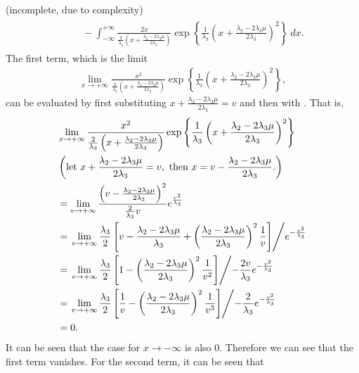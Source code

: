 \begin{answer}{(incomplete, due to complexity)}
\begin{align}
\begin{split}
			&\phantom{=} - \int_{-\infty}^{+\infty} \frac{2x}{\frac{2}{\lambda_3} \left( x + \frac{\lambda_2 - 2\lambda_3\mu}{2\lambda_3} \right)}\exp\left\{ \frac{1}{\lambda_3} \left( x + \frac{\lambda_2 - 2\lambda_3\mu}{2\lambda_3} \right)^2  \right\}\ dx.
		\end{split}
	\end{align}
	The first term, which is the limit
	\begin{align}
		\lim_{x \rightarrow +\infty} \frac{x^2}{\frac{2}{\lambda_3} \left( x + \frac{\lambda_2 - 2\lambda_3\mu}{2\lambda_3} \right)}\exp\left\{ \frac{1}{\lambda_3} \left( x + \frac{\lambda_2 - 2\lambda_3\mu}{2\lambda_3} \right)^2  \right\},
	\end{align}
	can be evaluated by first substituting $x + \frac{\lambda_2 - 2\lambda_3\mu}{2\lambda_3} = v$ and then with \lhopitalsrule. That is,
	\begin{align}
		&\lim_{x \rightarrow +\infty} \frac{x^2}{\frac{2}{\lambda_3} \left( x + \frac{\lambda_2 - 2\lambda_3\mu}{2\lambda_3} \right)}\exp\left\{ \frac{1}{\lambda_3} \left( x + \frac{\lambda_2 - 2\lambda_3\mu}{2\lambda_3} \right)^2  \right\}\\
		&\left( \mbox{let } x + \frac{\lambda_2 - 2\lambda_3\mu}{2\lambda_3} = v, \mbox{ then } x  = v - \frac{\lambda_2 - 2\lambda_3\mu}{2\lambda_3}.\right) \nonumber\\
		&= \lim_{v \rightarrow +\infty} \frac{\left( v - \frac{\lambda_2 - 2\lambda_3\mu}{2\lambda_3} \right)^2}{\frac{2}{\lambda_3} v }e^{\frac{v^2}{\lambda_3}}\\
		&= \left.\lim_{v \rightarrow +\infty} \frac{\lambda_3}{2} \left[ v - \frac{\lambda_2 - 2\lambda_3\mu}{\lambda_3} + \left(\frac{\lambda_2 - 2\lambda_3\mu}{2\lambda_3}\right)^2\frac{1}{v} \right] \middle/ e^{-\frac{v^2}{\lambda_3}} \right.\\
		&= \left.\lim_{v \rightarrow +\infty} \frac{\lambda_3}{2} \left[1  - \left(\frac{\lambda_2 - 2\lambda_3\mu}{2\lambda_3}\right)^2 \frac{1}{v^2}\right] \middle/ -\frac{2v}{\lambda_3}e^{-\frac{v^2}{\lambda_3}} \right.\\
		&= \left.\lim_{v \rightarrow +\infty} \frac{\lambda_3}{2} \left[ \frac{1}{v}  - \left(\frac{\lambda_2 - 2\lambda_3\mu}{2\lambda_3}\right)^2 \frac{1}{v^3}\right] \middle/ -\frac{2}{\lambda_3}e^{-\frac{v^2}{\lambda_3}} \right.\\
		&= 0.
	\end{align}
	It can be seen that the case for $x \rightarrow -\infty$ is also 0. Therefore we can see that the first term vanishes. For the second term, it can be seen that

\end{answer}
